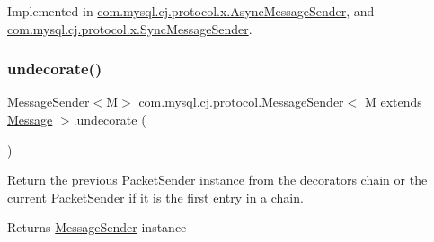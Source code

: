 Implemented in \mbox{\hyperlink{classcom_1_1mysql_1_1cj_1_1protocol_1_1x_1_1_async_message_sender_a9350fb34edd02d90eebe96812dd85e25}{com.\+mysql.\+cj.\+protocol.\+x.\+Async\+Message\+Sender}}, and \mbox{\hyperlink{classcom_1_1mysql_1_1cj_1_1protocol_1_1x_1_1_sync_message_sender_aa403c14cdcc078b9250830c85f6dbbf9}{com.\+mysql.\+cj.\+protocol.\+x.\+Sync\+Message\+Sender}}.

\mbox{\label{interfacecom_1_1mysql_1_1cj_1_1protocol_1_1_message_sender_a3a352bf35ad98dc6cea7c1f4ac9480da}} 
\subsubsection{\texorpdfstring{undecorate()}{undecorate()}}
{\footnotesize\ttfamily \mbox{\hyperlink{interfacecom_1_1mysql_1_1cj_1_1protocol_1_1_message_sender}{Message\+Sender}}$<$M$>$ \mbox{\hyperlink{interfacecom_1_1mysql_1_1cj_1_1protocol_1_1_message_sender}{com.\+mysql.\+cj.\+protocol.\+Message\+Sender}}$<$ M extends \mbox{\hyperlink{interfacecom_1_1mysql_1_1cj_1_1protocol_1_1_message}{Message}} $>$.undecorate (\begin{DoxyParamCaption}{ }\end{DoxyParamCaption})}

Return the previous Packet\+Sender instance from the decorators chain or the current Packet\+Sender if it is the first entry in a chain.

\begin{DoxyReturn}{Returns}
\mbox{\hyperlink{interfacecom_1_1mysql_1_1cj_1_1protocol_1_1_message_sender}{Message\+Sender}} instance 
\end{DoxyReturn}


